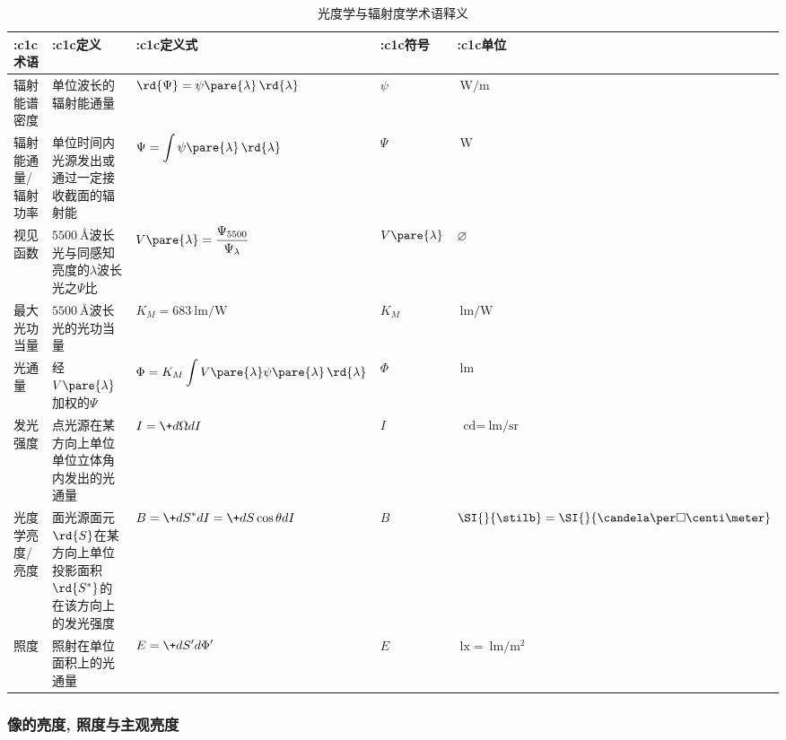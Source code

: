 \documentclass{ctexart}
\begin{document}

\begin{table}[ht]
    \centering
    \begin{tabular}{>{\centering\arraybackslash}m{1.5cm}m{3cm}>{\centering\arraybackslash}m{3cm}>{\centering\arraybackslash}m{1cm}>{\centering\arraybackslash}m{1.2cm}}
        \toprule
        \+:c{1}{c}{术语} & \+:c{1}{c}{定义} & \+:c{1}{c}{定义式} & \+:c{1}{c}{符号} & \+:c{1}{c}{单位} \\
        \midrule
        辐射能谱密度 & 单位波长的辐射能通量 & $\displaystyle \rd{\Psi} = \psi\pare{\lambda}\,\rd{\lambda}$ & $\psi$ & $\SI{}{\watt\per\meter}$ \\
        \midrule
        辐射能通量/辐射功率 & 单位时间内光源发出或通过一定接收截面的辐射能 & $\displaystyle \Psi = \int \psi\pare{\lambda}\,\rd{\lambda}$ & $\Psi$ & $\SI{}{\watt}$ \\
        \midrule
        视见函数 & $\SI{5500}{\angstrom}$波长光与同感知亮度的$\lambda$波长光之$\Psi$比 & $\displaystyle V\pare{\lambda} = \frac{\Psi_{5500}}{\Psi_\lambda}$ & $V\pare{\lambda}$ & $\varnothing$ \\
        \midrule
        最大光功当量 & $\SI{5500}{\angstrom}$波长光的光功当量 & $K_M = \SI{683}{\lumen\per\watt}$ & $K_M$ & $\SI{}{\lumen\per\watt}$ \\
        \midrule
        光通量 & 经$V\pare{\lambda}$加权的$\Psi$ & $\displaystyle \Phi = K_M \int V\pare{\lambda}\psi\pare{\lambda}\,\rd{\lambda}$ & $\Phi$ & $\SI{}{\lumen}$ \\
        \midrule
        发光强度 & 点光源在某方向上单位单位立体角内发出的光通量 & $\displaystyle I = \+d\Omega dI$ & $I$ & $\SI{}{\candela}=\allowbreak\SI{}{\lumen\per\steradian}$ \\
        \midrule
        光度学亮度/亮度 & 面光源面元$\rd{S}$在某方向上单位投影面积$\rd{S^*}$的在该方向上的发光强度 & $\displaystyle B = \+d{S^*}dI \allowbreak= \+d{S\cos\theta}d{I}$ & $B$ & $\SI{}{\stilb}=\allowbreak\SI{}{\candela\per\square\centi\meter}$ \\
        \midrule
        照度 & 照射在单位面积上的光通量 & $\displaystyle E = \+d{S'}d{\Phi'}$ & $E$ & $\SI{}{\lux} = \allowbreak\SI{}{\lumen\per\square\meter}$ \\
        \bottomrule
    \end{tabular}
    \caption{光度学与辐射度学术语释义}
    \label{table:光度学与辐射度学术语释义}
\end{table}

\subsubsection{像的亮度, 照度与主观亮度} %
\label{ssub:像的亮度_照度与主观亮度}
\end{document}

